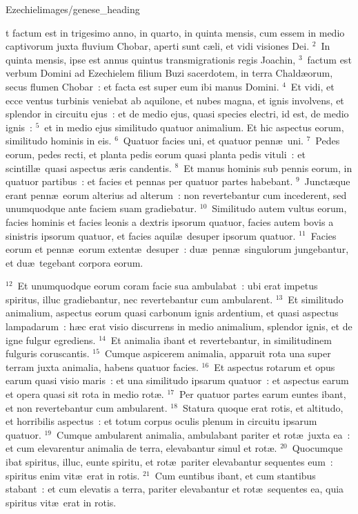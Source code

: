 {Ezechiel}{images/genese_heading}


\bchapter
{}t factum est in trigesimo anno, in quarto, in quinta mensis, cum essem in medio captivorum juxta fluvium Chobar, aperti sunt c\ae li, et vidi visiones Dei.
${}^{2}$~In quinta mensis, ipse est annus quintus transmigrationis regis Joachin,
${}^{3}$~factum est verbum Domini ad Ezechielem filium Buzi sacerdotem, in terra Chald\ae orum, secus flumen Chobar~: et facta est super eum ibi manus Domini.
${}^{4}$~Et vidi, et ecce ventus turbinis veniebat ab aquilone, et nubes magna, et ignis involvens, et splendor in circuitu ejus~: et de medio ejus, quasi species electri, id est, de medio ignis~:
${}^{5}$~et in medio ejus similitudo quatuor animalium. Et hic aspectus eorum, similitudo hominis in eis.
${}^{6}$~Quatuor facies uni, et quatuor penn\ae\ uni.
${}^{7}$~Pedes eorum, pedes recti, et planta pedis eorum quasi planta pedis vituli~: et scintill\ae\ quasi aspectus \ae ris candentis.
${}^{8}$~Et manus hominis sub pennis eorum, in quatuor partibus~: et facies et pennas per quatuor partes habebant.
${}^{9}$~Junct\ae que erant penn\ae\ eorum alterius ad alterum~: non revertebantur cum incederent, sed unumquodque ante faciem suam gradiebatur.
${}^{10}$~Similitudo autem vultus eorum, facies hominis et facies leonis a dextris ipsorum quatuor, facies autem bovis a sinistris ipsorum quatuor, et facies aquil\ae\ desuper ipsorum quatuor.
${}^{11}$~Facies eorum et penn\ae\ eorum extent\ae\ desuper~: du\ae\ penn\ae\ singulorum jungebantur, et du\ae\ tegebant corpora eorum.


${}^{12}$~Et unumquodque eorum coram facie sua ambulabat~: ubi erat impetus spiritus, illuc gradiebantur, nec revertebantur cum ambularent.
${}^{13}$~Et similitudo animalium, aspectus eorum quasi carbonum ignis ardentium, et quasi aspectus lampadarum~: h\ae c erat visio discurrens in medio animalium, splendor ignis, et de igne fulgur egrediens.
${}^{14}$~Et animalia ibant et revertebantur, in similitudinem fulguris coruscantis.
${}^{15}$~Cumque aspicerem animalia, apparuit rota una super terram juxta animalia, habens quatuor facies.
${}^{16}$~Et aspectus rotarum et opus earum quasi visio maris~: et una similitudo ipsarum quatuor~: et aspectus earum et opera quasi sit rota in medio rot\ae .
${}^{17}$~Per quatuor partes earum euntes ibant, et non revertebantur cum ambularent.
${}^{18}$~Statura quoque erat rotis, et altitudo, et horribilis aspectus~: et totum corpus oculis plenum in circuitu ipsarum quatuor.
${}^{19}$~Cumque ambularent animalia, ambulabant pariter et rot\ae\ juxta ea~: et cum elevarentur animalia de terra, elevabantur simul et rot\ae .
${}^{20}$~Quocumque ibat spiritus, illuc, eunte spiritu, et rot\ae\ pariter elevabantur sequentes eum~: spiritus enim vit\ae\ erat in rotis.
${}^{21}$~Cum euntibus ibant, et cum stantibus stabant~: et cum elevatis a terra, pariter elevabantur et rot\ae\ sequentes ea, quia spiritus vit\ae\ erat in rotis.


